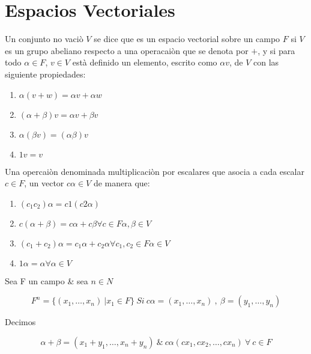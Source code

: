 \newpage 
\section{Espacios Vectoriales}

	\begin{definicion}

Un conjunto no vaci\`o $V$  se dice que es un espacio vectorial sobre un campo $F$ si $V$ es un grupo abeliano respecto a una operacai\`on que se denota por $+$, y si para todo $\alpha \in F$, $v\in V$ est\`a definido un elemento, escrito como $\alpha v$, de $V$ con las siguiente propiedades: 
\end{definicion}
 \begin{enumerate}
  \item $\alpha (v+w)=\alpha v+\alpha w$
  \item $(\alpha+\beta )v=\alpha v+\beta v$
  \item $\alpha(\beta v)=(\alpha\beta)v$
  \item $1v=v$
\end{enumerate}

Una opercai\`on denominada multiplicaci\`on por escalares que asocia a cada escalar $c\in F  $, un vector $c \alpha \in V$ de manera que:

\begin{enumerate}[a]
	\item $( c_1 c_2 ) \alpha = c1 ( c2 \alpha )$
	\item $c ( \alpha + \beta ) = c \alpha + c \beta \forall c \in F \alpha,\beta \in V$
	\item $(c_1 + c_2 ) \alpha = c_1  \alpha + c_2 \alpha \forall c_1 , c_2 \in F \alpha \in V$
	\item $ 1 \alpha = \alpha \forall \alpha \in V$	
\end{enumerate}
		
		\begin{definicion}
		Sea F un campo \& sea $n \in N$
		\end{definicion}		
		
		\begin{equation}
		F^n = \{ ( x_1 , \dots  , x_n) \ | x_1 \in F \} \ 
		Si  \ c \alpha = ( x_1 , \dots , x_n ) \ , \ \beta = ( y_1 , \dots , y_n )		
		\end{equation}
		
		Decimos 
		
		\begin{equation}
		\alpha + \beta = ( x_1 + y_1 , \dots , x_n + y_n  ) \ \&  \ c\alpha ( c x_1 ,c x_2 , 		\dots , c x_n ) \ \forall \ c \in F \nonumber
		\end{equation}				
		
